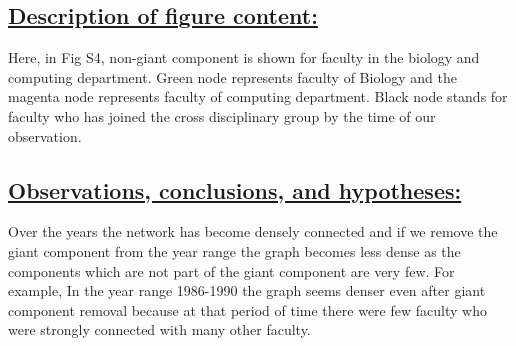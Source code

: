 \documentclass{article}\usepackage[]{graphicx}\usepackage[]{color}
\begin{document}
\subsection*{\underline{Description of figure content:}}
\par{Here, in Fig S4, non-giant component is shown for faculty in the biology and computing department. Green node represents faculty of Biology and the magenta node represents faculty of computing department. Black node stands for faculty who has joined the cross disciplinary group by the time of our observation.}
\subsection*{\underline{Observations, conclusions, and hypotheses:}}
\par{Over the years the network has become densely connected and if we remove the giant component from the year range the graph becomes less dense as the components which are not part of the giant component are very few. For example, In the year range 1986-1990 the graph seems denser even after giant component removal because at that period of time there were few faculty who were strongly connected with many other faculty.}
\end{document}
